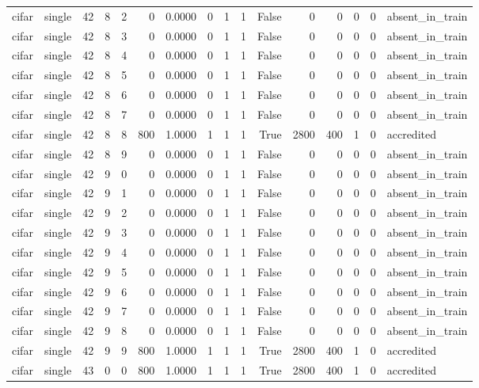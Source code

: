 \begin{tabular}{llrrrrrrrrrrrrrl}
cifar & single & 42 & 8 & 2 & 0 & 0.0000 & 0 & 1 & 1 & False & 0 & 0 & 0 & 0 & absent\_in\_train \\
cifar & single & 42 & 8 & 3 & 0 & 0.0000 & 0 & 1 & 1 & False & 0 & 0 & 0 & 0 & absent\_in\_train \\
cifar & single & 42 & 8 & 4 & 0 & 0.0000 & 0 & 1 & 1 & False & 0 & 0 & 0 & 0 & absent\_in\_train \\
cifar & single & 42 & 8 & 5 & 0 & 0.0000 & 0 & 1 & 1 & False & 0 & 0 & 0 & 0 & absent\_in\_train \\
cifar & single & 42 & 8 & 6 & 0 & 0.0000 & 0 & 1 & 1 & False & 0 & 0 & 0 & 0 & absent\_in\_train \\
cifar & single & 42 & 8 & 7 & 0 & 0.0000 & 0 & 1 & 1 & False & 0 & 0 & 0 & 0 & absent\_in\_train \\
cifar & single & 42 & 8 & 8 & 800 & 1.0000 & 1 & 1 & 1 & True & 2800 & 400 & 1 & 0 & accredited \\
cifar & single & 42 & 8 & 9 & 0 & 0.0000 & 0 & 1 & 1 & False & 0 & 0 & 0 & 0 & absent\_in\_train \\
cifar & single & 42 & 9 & 0 & 0 & 0.0000 & 0 & 1 & 1 & False & 0 & 0 & 0 & 0 & absent\_in\_train \\
cifar & single & 42 & 9 & 1 & 0 & 0.0000 & 0 & 1 & 1 & False & 0 & 0 & 0 & 0 & absent\_in\_train \\
cifar & single & 42 & 9 & 2 & 0 & 0.0000 & 0 & 1 & 1 & False & 0 & 0 & 0 & 0 & absent\_in\_train \\
cifar & single & 42 & 9 & 3 & 0 & 0.0000 & 0 & 1 & 1 & False & 0 & 0 & 0 & 0 & absent\_in\_train \\
cifar & single & 42 & 9 & 4 & 0 & 0.0000 & 0 & 1 & 1 & False & 0 & 0 & 0 & 0 & absent\_in\_train \\
cifar & single & 42 & 9 & 5 & 0 & 0.0000 & 0 & 1 & 1 & False & 0 & 0 & 0 & 0 & absent\_in\_train \\
cifar & single & 42 & 9 & 6 & 0 & 0.0000 & 0 & 1 & 1 & False & 0 & 0 & 0 & 0 & absent\_in\_train \\
cifar & single & 42 & 9 & 7 & 0 & 0.0000 & 0 & 1 & 1 & False & 0 & 0 & 0 & 0 & absent\_in\_train \\
cifar & single & 42 & 9 & 8 & 0 & 0.0000 & 0 & 1 & 1 & False & 0 & 0 & 0 & 0 & absent\_in\_train \\
cifar & single & 42 & 9 & 9 & 800 & 1.0000 & 1 & 1 & 1 & True & 2800 & 400 & 1 & 0 & accredited \\
cifar & single & 43 & 0 & 0 & 800 & 1.0000 & 1 & 1 & 1 & True & 2800 & 400 & 1 & 0 & accredited \\

\end{tabular}
